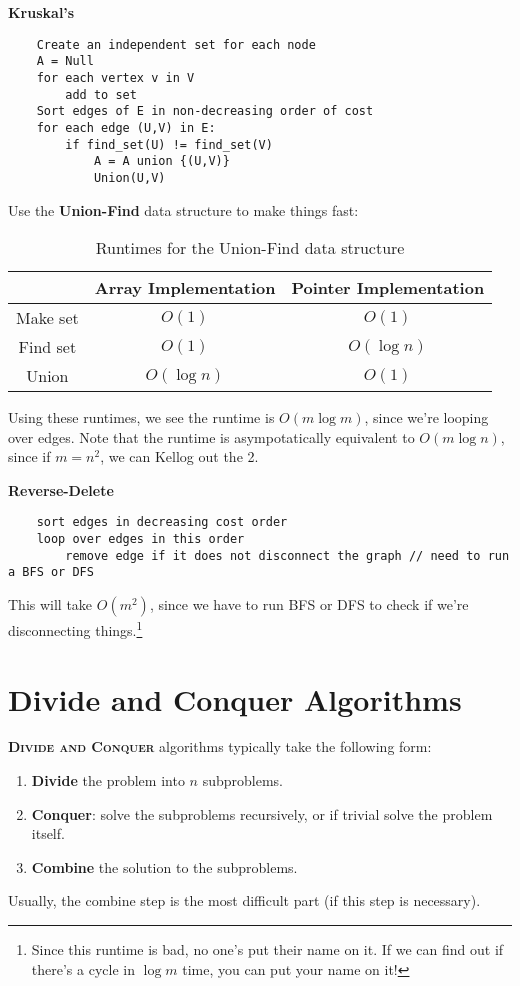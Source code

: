 \documentclass[11pt]{article}
\begin{document}
\textbf{Kruskal's}
\begin{verbatim}
    Create an independent set for each node
    A = Null
    for each vertex v in V
        add to set
    Sort edges of E in non-decreasing order of cost
    for each edge (U,V) in E:
        if find_set(U) != find_set(V)
            A = A union {(U,V)}
            Union(U,V)
\end{verbatim}
Use the \textbf{Union-Find} data structure to make things fast:
\begin{table}[H]
    \centering
    \begin{tabular}{c|c|c}
    \toprule
         & Array Implementation& Pointer Implementation \\ \midrule
        Make set & $O(1)$ & $O(1)$ \\
        Find set & $O(1)$ & $O(\log n)$ \\
        Union & $O(\log n)$ & $O(1)$ \\
    \bottomrule
    \end{tabular}
    \caption{Runtimes for the Union-Find data structure}
    \label{tab:un_find}
\end{table}
Using these runtimes, we see the runtime is $O(m \log m)$, since we're looping over edges. Note that the runtime is asympotatically equivalent to $O(m \log n)$, since if $m = n^2$, we can Kellog out the 2.

\textbf{Reverse-Delete}
\begin{verbatim}
    sort edges in decreasing cost order
    loop over edges in this order
        remove edge if it does not disconnect the graph // need to run a BFS or DFS
\end{verbatim}
This will take $O(m^2)$, since we have to run BFS or DFS to check if we're disconnecting things.\footnote{Since this runtime is bad, no one's put their name on it. If we can find out if there's a cycle in $\log m$ time, you can put your name on it!}

\newpage
\section{Divide and Conquer Algorithms}
\begin{tcolorbox}
\textsc{\textbf{Divide and Conquer}} algorithms typically take the following form:
\begin{enumerate}
    \item \textbf{Divide} the problem into $n$ subproblems.
    \item \textbf{Conquer}: solve the subproblems recursively, or if trivial solve the problem itself.
    \item \textbf{Combine} the solution to the subproblems.
\end{enumerate}
Usually, the combine step is the most difficult part (if this step is necessary).
\end{tcolorbox}
\end{document}
